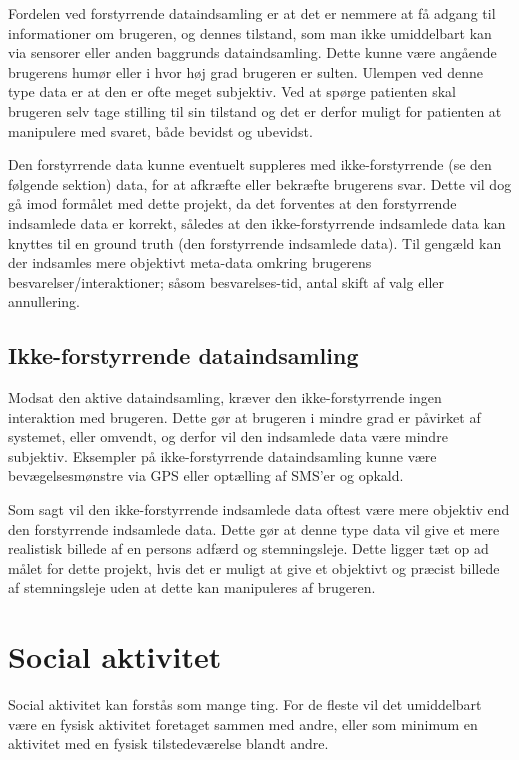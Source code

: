 Fordelen ved forstyrrende dataindsamling er at det er nemmere at få adgang til informationer om brugeren, og dennes tilstand, som man ikke umiddelbart kan via sensorer eller anden baggrunds dataindsamling.
Dette kunne være angående brugerens humør eller i hvor høj grad brugeren er sulten.
Ulempen ved denne type data er at den er ofte meget subjektiv. 
Ved at spørge patienten skal brugeren selv tage stilling til sin tilstand og det er derfor muligt for patienten at manipulere med svaret, både bevidst og ubevidst.

Den forstyrrende data kunne eventuelt suppleres med ikke-forstyrrende (se den følgende sektion) data, for at afkræfte eller bekræfte brugerens svar.
Dette vil dog gå imod formålet med dette projekt, da det forventes at den forstyrrende indsamlede data er korrekt, således at den ikke-forstyrrende indsamlede data kan knyttes til en ground truth (den forstyrrende indsamlede data).
Til gengæld kan der indsamles mere objektivt meta-data omkring brugerens besvarelser/interaktioner; såsom besvarelses-tid, antal skift af valg eller annullering.

\subsection{Ikke-forstyrrende dataindsamling}
Modsat den aktive dataindsamling, kræver den ikke-forstyrrende ingen interaktion med brugeren.
Dette gør at brugeren i mindre grad er påvirket af systemet, eller omvendt, og derfor vil den indsamlede data være mindre subjektiv.
Eksempler på ikke-forstyrrende dataindsamling kunne være bevægelsesmønstre via GPS eller optælling af SMS'er og opkald.

Som sagt vil den ikke-forstyrrende indsamlede data oftest være mere objektiv end den forstyrrende indsamlede data.
Dette gør at denne type data vil give et mere realistisk billede af en persons adfærd og stemningsleje.
Dette ligger tæt op ad målet for dette projekt, hvis det er muligt at give et objektivt og præcist billede af stemningsleje uden at dette kan manipuleres af brugeren.

\section{Social aktivitet}
Social aktivitet kan forstås som mange ting.
For de fleste vil det umiddelbart være en fysisk aktivitet foretaget sammen med andre, eller som minimum en aktivitet med en fysisk tilstedeværelse blandt andre.

